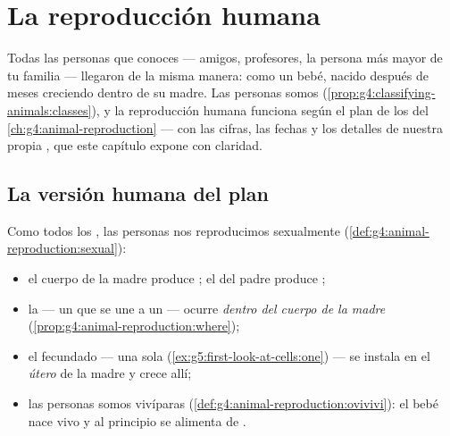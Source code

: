 \chapter{La reproducción humana}\label{ch:g5:human-reproduction}

Todas las personas que conoces --- amigos, profesores, la persona más
mayor de tu familia --- llegaron de la misma manera: como un bebé,
nacido después de meses creciendo dentro de su madre. Las personas
somos  (\cref{prop:g4:classifying-animals:classes}), y la
reproducción humana funciona según el plan de los  del
\cref{ch:g4:animal-reproduction} --- con las cifras, las fechas y los
detalles de nuestra propia , que este capítulo expone con
claridad.

\section{La versión humana del plan}

\begin{proposition}\label{prop:g5:human-reproduction:plan}
Como todos los , las personas nos reproducimos sexualmente
(\cref{def:g4:animal-reproduction:sexual}):
\begin{itemize}
  \item el cuerpo de la madre produce \emph{}; el del padre
        produce \emph{};
  \item la  --- un  que se une a un  ---
        ocurre \emph{dentro del cuerpo de la madre}
        (\cref{prop:g4:animal-reproduction:where});
  \item el  fecundado --- una sola 
        (\cref{ex:g5:first-look-at-cells:one}) --- se instala en el
        \emph{útero} de la madre y crece allí;
  \item las personas somos vivíparas
        (\cref{def:g4:animal-reproduction:ovivivi}): el bebé nace vivo
        y al principio se alimenta de .
\end{itemize}
\end{proposition}
\admitted

